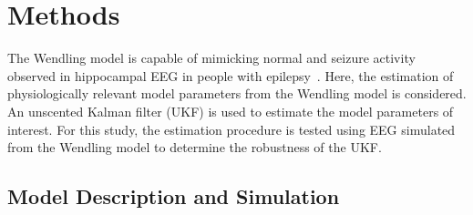 \section{Methods}

The Wendling model is capable of mimicking normal and seizure activity observed in hippocampal EEG in people with epilepsy~\citep{wendling2002epileptic,wendling2005interictal}. Here, the estimation of physiologically relevant model parameters from the Wendling model is considered. An unscented Kalman filter (UKF) is used to estimate the model parameters of interest. For this study, the estimation procedure is tested using EEG simulated from the Wendling model to determine the robustness of the UKF.

\subsection{Model Description and Simulation} %

